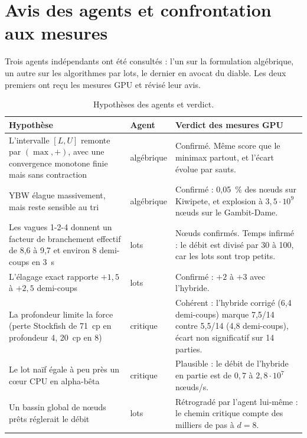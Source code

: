 \documentclass[11pt,a4paper]{article}
\begin{document}
\section{Avis des agents et confrontation aux mesures}
Trois agents indépendants ont été consultés : l'un sur la formulation algébrique, un autre sur les
algorithmes par lots, le dernier en avocat du diable. Les deux premiers ont reçu les mesures GPU
et révisé leur avis.

\begin{table}[H]
\centering\small
\begin{tabular}{p{5.2cm}p{4.2cm}p{5.2cm}}
\toprule
Hypothèse & Agent & Verdict des mesures GPU\\
\midrule
L'intervalle $[L,U]$ remonte par $(\max,+)$, avec une convergence monotone finie mais sans
contraction & algébrique & Confirmé. Même score que le minimax partout, et l'écart évolue par
sauts.\\
YBW élague massivement, mais reste sensible au tri & algébrique & Confirmé : 0{,}05~\% des nœuds
sur Kiwipete, et explosion à $3{,}5\cdot10^9$ nœuds sur le Gambit-Dame.\\
Les vagues 1-2-4 donnent un facteur de branchement effectif de 8,6 à 9,7 et environ 8 demi-coups
en 3~s & lots & Nœuds confirmés. Temps infirmé : le débit est divisé par 30 à 100, car les lots
sont trop petits.\\
L'élagage exact rapporte $+1{,}5$ à $+2{,}5$ demi-coups & lots & Confirmé : $+2$ à $+3$ avec
l'hybride.\\
La profondeur limite la force (perte Stockfish de 71~cp en profondeur 4, 20~cp en 8) & critique &
Cohérent : l'hybride corrigé (6{,}4 demi-coups) marque 7{,}5/14 contre 5{,}5/14 (4{,}8 demi-coups),
écart non significatif sur 14 parties.\\
Le lot naïf égale à peu près un cœur CPU en alpha-bêta & critique & Plausible : le débit de
l'hybride en partie est de $0{,}7$ à $2{,}8\cdot10^7$ nœuds/s.\\
Un bassin global de nœuds prêts réglerait le débit & lots & Rétrogradé par l'agent lui-même : le
chemin critique compte des milliers de pas à $d=8$.\\
\bottomrule
\end{tabular}
\caption{Hypothèses des agents et verdict.}
\end{table}
\end{document}
